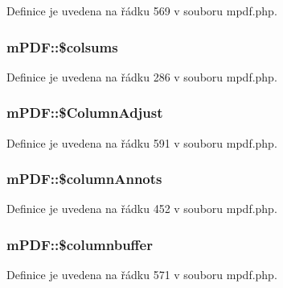 Definice je uvedena na řádku 569 v souboru mpdf.\-php.

\hypertarget{classm_p_d_f_afde0ad773254d4b04701f96fcfff9b2f}{
\subsubsection[{\$colsums}]{\setlength{\rightskip}{0pt plus 5cm}m\-P\-D\-F\-::\$colsums}}\label{classm_p_d_f_afde0ad773254d4b04701f96fcfff9b2f}


Definice je uvedena na řádku 286 v souboru mpdf.\-php.

\hypertarget{classm_p_d_f_a8d5c600f88762ee88b2bf044241c36a9}{
\subsubsection[{\$\-Column\-Adjust}]{\setlength{\rightskip}{0pt plus 5cm}m\-P\-D\-F\-::\$\-Column\-Adjust}}\label{classm_p_d_f_a8d5c600f88762ee88b2bf044241c36a9}


Definice je uvedena na řádku 591 v souboru mpdf.\-php.

\hypertarget{classm_p_d_f_a143a18b818e279488b3b7cdbaf49676d}{
\subsubsection[{\$column\-Annots}]{\setlength{\rightskip}{0pt plus 5cm}m\-P\-D\-F\-::\$column\-Annots}}\label{classm_p_d_f_a143a18b818e279488b3b7cdbaf49676d}


Definice je uvedena na řádku 452 v souboru mpdf.\-php.

\hypertarget{classm_p_d_f_aabfc100308c40e12ebfdd24c4d60b424}{
\subsubsection[{\$columnbuffer}]{\setlength{\rightskip}{0pt plus 5cm}m\-P\-D\-F\-::\$columnbuffer}}\label{classm_p_d_f_aabfc100308c40e12ebfdd24c4d60b424}


Definice je uvedena na řádku 571 v souboru mpdf.\-php.

